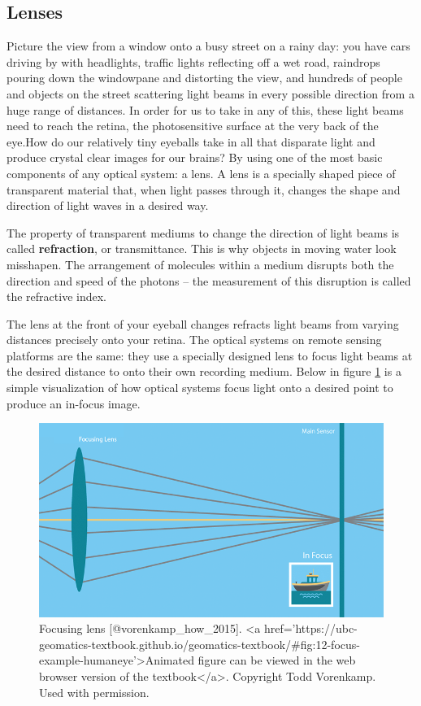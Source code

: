 \documentclass[
]{book}
\begin{document}
\subsection{Lenses}\label{lenses}

Picture the view from a window onto a busy street on a rainy day: you have cars driving by with headlights, traffic lights reflecting off a wet road, raindrops pouring down the windowpane and distorting the view, and hundreds of people and objects on the street scattering light beams in every possible direction from a huge range of distances. In order for us to take in any of this, these light beams need to reach the retina, the photosensitive surface at the very back of the eye.How do our relatively tiny eyeballs take in all that disparate light and produce crystal clear images for our brains? By using one of the most basic components of any optical system: a lens. A lens is a specially shaped piece of transparent material that, when light passes through it, changes the shape and direction of light waves in a desired way.

The property of transparent mediums to change the direction of light beams is called \textbf{refraction}, or transmittance. This is why objects in moving water look misshapen. The arrangement of molecules within a medium disrupts both the direction and speed of the photons -- the measurement of this disruption is called the refractive index.

The lens at the front of your eyeball changes refracts light beams from varying distances precisely onto your retina. The optical systems on remote sensing platforms are the same: they use a specially designed lens to focus light beams at the desired distance to onto their own recording medium. Below in figure \ref{fig:12-focus-example-humaneye} is a simple visualization of how optical systems focus light onto a desired point to produce an in-focus image.

\begin{figure}
\includegraphics[width=0.9\linewidth]{images/12-focus_example_humaneye} \caption{Focusing lens [@vorenkamp_how_2015]. <a href='https://ubc-geomatics-textbook.github.io/geomatics-textbook/#fig:12-focus-example-humaneye'>Animated figure can be viewed in the web browser version of the textbook</a>. Copyright Todd Vorenkamp. Used with permission.}\label{fig:12-focus-example-humaneye}
\end{figure}
\end{document}
